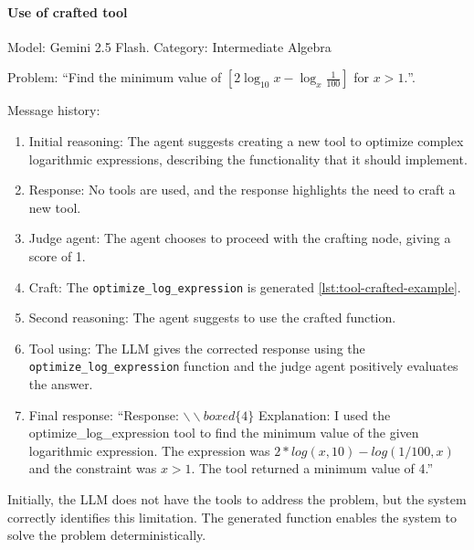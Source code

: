 \documentclass[12pt,a4paper,openright,twoside]{book}
\begin{document}
\paragraph{Use of crafted tool} {Model: Gemini 2.5 Flash. Category: Intermediate Algebra

Problem: ``Find the minimum value of $[2 \log_{10} x - \log_x \frac{1}{100}]$ for $x > 1.$''.

Message history:
\begin{enumerate}
    \item Initial reasoning: The agent suggests creating a new tool to optimize complex logarithmic expressions, describing the functionality that it should implement.
    \item Response: No tools are used, and the response highlights the need to craft a new tool.
    \item Judge agent: The agent chooses to proceed with the crafting node, giving a score of 1.
    \item Craft: The \texttt{optimize\_log\_expression} is generated \cref{lst:tool-crafted-example}. 
    \item Second reasoning: The agent suggests to use the crafted function.
    \item Tool using: The \ac{LLM} gives the corrected response using the \texttt{optimize\_log\_expression} function and the judge agent positively evaluates the answer.
    \item Final response: ``Response: $\backslash\backslash boxed\{4\}$ Explanation: I used the optimize\_log\_expression tool to find the minimum value of the given logarithmic expression. The expression was $2*log(x, 10) - log(1/100, x)$ and the constraint was $x > 1$. The tool returned a minimum value of 4.'' 
\end{enumerate}
Initially, the \ac{LLM} does not have the tools to address the problem, but the system correctly identifies this limitation. 
The generated function enables the system to solve the problem deterministically.
}
\end{document}
